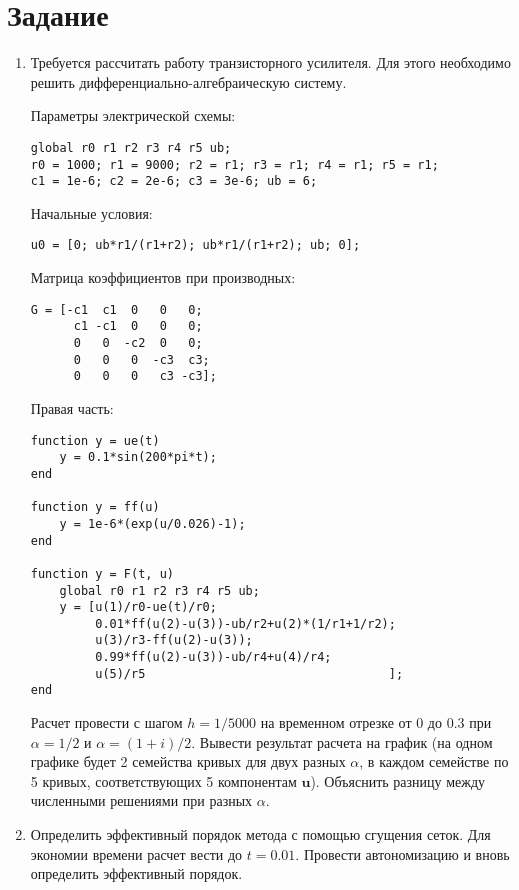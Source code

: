 \section{Задание}
\begin{enumerate}
\item Требуется рассчитать работу транзисторного усилителя. Для этого необходимо решить дифференциально-алгебраическую систему.

Параметры электрической схемы:
\begin{matlablisting}
	\begin{verbatim}
global r0 r1 r2 r3 r4 r5 ub;
r0 = 1000; r1 = 9000; r2 = r1; r3 = r1; r4 = r1; r5 = r1;
c1 = 1e-6; c2 = 2e-6; c3 = 3e-6; ub = 6;
	\end{verbatim}
\end{matlablisting}
Начальные условия:
\begin{matlablisting}
	\begin{verbatim}
u0 = [0; ub*r1/(r1+r2); ub*r1/(r1+r2); ub; 0];
	\end{verbatim}
\end{matlablisting}
Матрица коэффициентов при производных:
\begin{matlablisting}
	\begin{verbatim}
G = [-c1  c1  0   0   0;
      c1 -c1  0   0   0;
      0   0  -c2  0   0;
      0   0   0  -c3  c3;
      0   0   0   c3 -c3];
	\end{verbatim}
\end{matlablisting}
Правая часть:
\begin{matlablisting}
	\begin{verbatim}
function y = ue(t)
    y = 0.1*sin(200*pi*t);
end

function y = ff(u)
    y = 1e-6*(exp(u/0.026)-1);
end

function y = F(t, u)
    global r0 r1 r2 r3 r4 r5 ub;
    y = [u(1)/r0-ue(t)/r0; 
         0.01*ff(u(2)-u(3))-ub/r2+u(2)*(1/r1+1/r2);
         u(3)/r3-ff(u(2)-u(3)); 
         0.99*ff(u(2)-u(3))-ub/r4+u(4)/r4; 
         u(5)/r5                                  ];
end
	\end{verbatim}
\end{matlablisting}
Расчет провести с шагом $h = 1/5000$ на временном отрезке от 0 до 0.3 при $\alpha = 1/2$ и $\alpha = (1+i)/2$. Вывести результат расчета на график (на одном графике будет 2 семейства кривых для двух разных $\alpha$, в каждом семействе по 5 кривых, соответствующих 5 компонентам $\mathbf{u}$). Объяснить разницу между численными решениями при разных $\alpha$.
\item Определить  эффективный порядок метода с помощью сгущения сеток. Для экономии времени расчет вести до $t = 0.01$. Провести автономизацию и вновь определить эффективный порядок.
\end{enumerate}